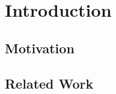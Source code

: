 \chapter{Introduction}
\label{ch:introduction}

\section{Motivation}
\label{sec:motivation}
\section{Related Work}
\label{sec:related-work}

